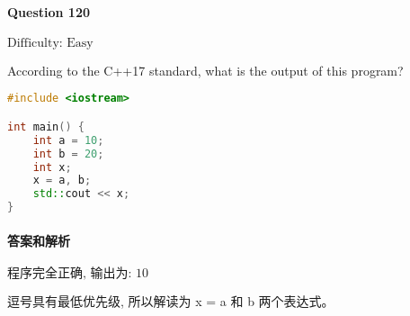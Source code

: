 \documentclass{article}
\begin{document}
	\paragraph*{Question 120} $\boxed{\text{Difficulty: Easy}} $			
	
	According to the C++17 standard, what is the output of this program?
	
	\begin{lstlisting}[language=C++]  		
#include <iostream>

int main() {
	int a = 10;
	int b = 20;
	int x;
	x = a, b;
	std::cout << x;
}
	\end{lstlisting}
	
	
	\paragraph*{答案和解析} $\boxed{\text{程序完全正确, 输出为: 10}} $
	
	逗号具有最低优先级, 所以解读为 x = a 和 b 两个表达式。 
	
\end{document}
